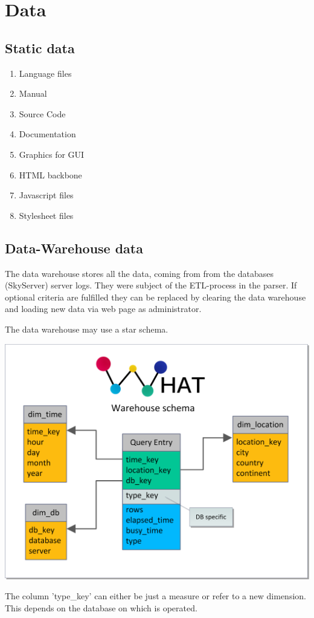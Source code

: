 \section{Data}
\renewcommand{\theenumi}{/D\arabic{enumi}0/}
\renewcommand{\labelenumi}{\theenumi}

\subsection{Static data}

\begin{enumerate}
  \item Language files
  \item Manual
  \item Source Code
  \item Documentation
  \item Graphics for GUI
  \item HTML backbone
  \item Javascript files
  \item Stylesheet files
\end{enumerate}



\newpage
\subsection{Data-Warehouse data} \label{WHschema}


The \gls{data warehouse} stores all the data, coming from from the \glspl{database} (\gls{SkyServer}) server logs.
They were subject of the \gls{ETL-process} in the parser. If optional criteria are fulfilled
 they can be replaced by clearing the \gls{data warehouse} 
 and loading new data via web page as administrator.

The \gls{data warehouse} may use a \gls{star schema}.
\begin{center}
\includegraphics[width=1\linewidth]{Pictures/WareHouseSchema.png} 
\end{center}   
The column 'type\_key' can either be just a \gls{measure} or refer to a new \gls{dimension}. This depends on the \gls{database}
on which is operated.  

